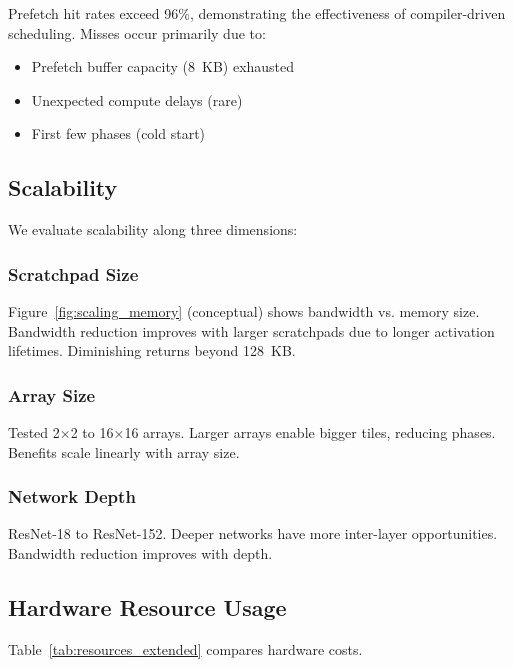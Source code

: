 \documentclass[journal]{IEEEtran}
\begin{document}
Prefetch hit rates exceed 96\%, demonstrating the effectiveness of compiler-driven scheduling. Misses occur primarily due to:
\begin{itemize}
\item Prefetch buffer capacity (8~KB) exhausted
\item Unexpected compute delays (rare)
\item First few phases (cold start)
\end{itemize}

\subsection{Scalability}

We evaluate scalability along three dimensions:

\subsubsection{Scratchpad Size}
Figure~\ref{fig:scaling_memory} (conceptual) shows bandwidth vs. memory size. Bandwidth reduction improves with larger scratchpads due to longer activation lifetimes. Diminishing returns beyond 128~KB.

\subsubsection{Array Size}
Tested 2$\times$2 to 16$\times$16 arrays. Larger arrays enable bigger tiles, reducing phases. Benefits scale linearly with array size.

\subsubsection{Network Depth}
ResNet-18 to ResNet-152. Deeper networks have more inter-layer opportunities. Bandwidth reduction improves with depth.

\subsection{Hardware Resource Usage}

Table~\ref{tab:resources_extended} compares hardware costs.
\end{document}
